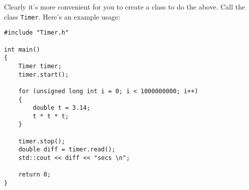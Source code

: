 Clearly it's more convenient for you to create
a class to do the above.
Call the class \texttt{Timer}.
Here's an example usage:
\begin{Verbatim}[frame=single,fontsize=\small]
#include "Timer.h"

int main()
{
    Timer timer;
    timer.start();
    
    for (unsigned long int i = 0; i < 1000000000; i++)
    {
        double t = 3.14;
        t * t * t;
    }

    timer.stop();
    double diff = timer.read();
    std::cout << diff << "secs \n";

    return 0;
}
\end{Verbatim}
